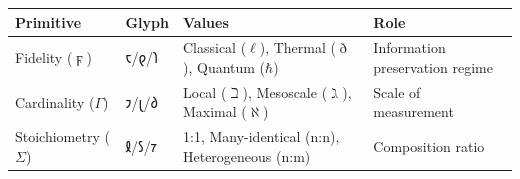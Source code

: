 \begin{longtable}[]{@{}llll@{}}
\toprule
\begin{minipage}[b]{0.30\columnwidth}\raggedright
Primitive\strut
\end{minipage} & \begin{minipage}[b]{0.19\columnwidth}\raggedright
Glyph\strut
\end{minipage} & \begin{minipage}[b]{0.22\columnwidth}\raggedright
Values\strut
\end{minipage} & \begin{minipage}[b]{0.17\columnwidth}\raggedright
Role\strut
\end{minipage}\tabularnewline
\midrule
\endhead
\begin{minipage}[t]{0.30\columnwidth}\raggedright
Fidelity (\(\digamma\))\strut
\end{minipage} & \begin{minipage}[t]{0.19\columnwidth}\raggedright
𐑱/𐑞/𐑐\strut
\end{minipage} & \begin{minipage}[t]{0.22\columnwidth}\raggedright
Classical (\(\ell\)), Thermal (\(\eth\)), Quantum (\(\hbar\))\strut
\end{minipage} & \begin{minipage}[t]{0.17\columnwidth}\raggedright
Information preservation regime\strut
\end{minipage}\tabularnewline
\begin{minipage}[t]{0.30\columnwidth}\raggedright
Cardinality (\(\Gamma\))\strut
\end{minipage} & \begin{minipage}[t]{0.19\columnwidth}\raggedright
𐑲/𐑚/𐑔\strut
\end{minipage} & \begin{minipage}[t]{0.22\columnwidth}\raggedright
Local (\(\beth\)), Mesoscale (\(\gimel\)), Maximal (\(\aleph\))\strut
\end{minipage} & \begin{minipage}[t]{0.17\columnwidth}\raggedright
Scale of measurement\strut
\end{minipage}\tabularnewline
\begin{minipage}[t]{0.30\columnwidth}\raggedright
Stoichiometry (\(\Sigma\))\strut
\end{minipage} & \begin{minipage}[t]{0.19\columnwidth}\raggedright
𐑙/𐑕/𐑳\strut
\end{minipage} & \begin{minipage}[t]{0.22\columnwidth}\raggedright
1:1, Many-identical (n:n), Heterogeneous (n:m)\strut
\end{minipage} & \begin{minipage}[t]{0.17\columnwidth}\raggedright
Composition ratio\strut
\end{minipage}\tabularnewline
\bottomrule
\end{longtable}

